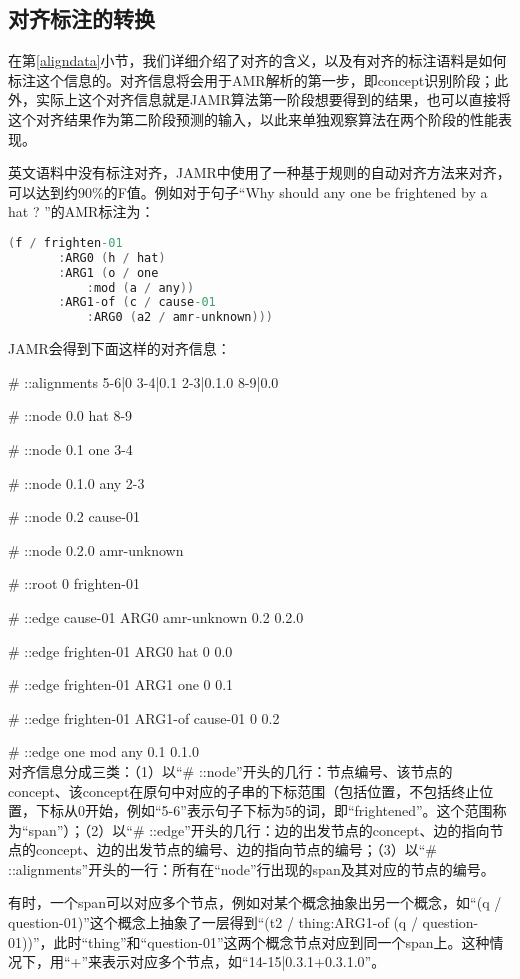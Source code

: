 \documentclass[master, winfont]{njuthesis}
\begin{document}
\subsection{对齐标注的转换}
\label{subsection:dataalign}
在第\ref{aligndata}小节，我们详细介绍了对齐的含义，以及有对齐的标注语料是如何标注这个信息的。对齐信息将会用于AMR解析的第一步，即concept识别阶段；此外，实际上这个对齐信息就是JAMR算法第一阶段想要得到的结果，也可以直接将这个对齐结果作为第二阶段预测的输入，以此来单独观察算法在两个阶段的性能表现。

英文语料中没有标注对齐，JAMR中使用了一种基于规则的自动对齐方法来对齐，可以达到约90\%的F值\cite{Flanigan2014}。例如对于句子“Why should any one be frightened by a hat ? ”的AMR标注为：
\begin{lstlisting}[language=C]
   (f / frighten-01
       :ARG0 (h / hat)
       :ARG1 (o / one
           :mod (a / any))
       :ARG1-of (c / cause-01
           :ARG0 (a2 / amr-unknown)))
\end{lstlisting}

JAMR会得到下面这样的对齐信息：\par
\# ::alignments 5-6|0 3-4|0.1 2-3|0.1.0 8-9|0.0 \par
\# ::node	0.0	hat	8-9  \par
\# ::node	0.1	one	3-4  \par
\# ::node	0.1.0	any	2-3  \par
\# ::node	0.2	cause-01	  \par
\# ::node	0.2.0	amr-unknown  \par	
\# ::root	0	frighten-01 \par
\# ::edge	cause-01	ARG0	amr-unknown	0.2	0.2.0	\par
\# ::edge	frighten-01	ARG0	hat	0	0.0	 \par
\# ::edge	frighten-01	ARG1	one	0	0.1	 \par
\# ::edge	frighten-01	ARG1-of	cause-01	0	0.2	 \par
\# ::edge	one	mod	any	0.1	0.1.0	 \\

对齐信息分成三类：（1）以“\# ::node”开头的几行：节点编号、该节点的concept、该concept在原句中对应的子串的下标范围（包括位置，不包括终止位置，下标从0开始，例如“5-6”表示句子下标为5的词，即“frightened”。这个范围称为“span”）；（2）以“\# ::edge”开头的几行：边的出发节点的concept、边的指向节点的concept、边的出发节点的编号、边的指向节点的编号；（3）以“\# ::alignments”开头的一行：所有在“node”行出现的span及其对应的节点的编号。

有时，一个span可以对应多个节点，例如对某个概念抽象出另一个概念，如“(q / question-01)”这个概念上抽象了一层得到“(t2 / thing:ARG1-of (q / question-01))”，此时“thing”和“question-01”这两个概念节点对应到同一个span上。这种情况下，用“+”来表示对应多个节点，如“14-15|0.3.1+0.3.1.0”。
\end{document}
